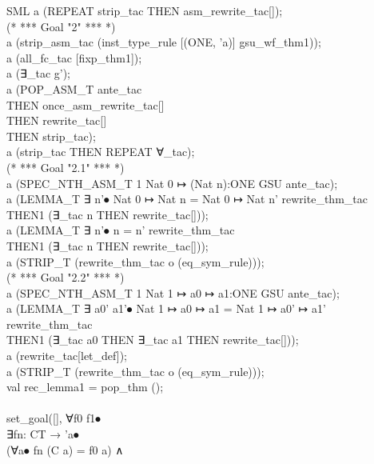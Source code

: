 {\begin{GFT}{SML}
\+a (REPEAT strip\_tac THEN asm\_rewrite\_tac[]);\\
\+(* *** Goal "2" *** *)\\
\+a (strip\_asm\_tac (inst\_type\_rule [(\PrJE{}ONE\PrKO{}, \PrJE{}'a\PrKO{})] gsu\_wf\_thm1));\\
\+a (all\_fc\_tac [fixp\_thm1]);\\
\+a (∃\_tac \PrKM{}g'\PrKO{});\\
\+a (POP\_ASM\_T ante\_tac\\
\+	THEN once\_asm\_rewrite\_tac[]\\
\+	THEN rewrite\_tac[]\\
\+	THEN strip\_tac);\\
\+a (strip\_tac THEN REPEAT ∀\_tac);\\
\+(* *** Goal "2.1" *** *)\\
\+a (SPEC\_NTH\_ASM\_T 1 \PrKM{}Nat 0 ↦ (Nat n):ONE GSU\PrKO{} ante\_tac);\\
\+a (LEMMA\_T \PrKM{}∃ n'⦁ Nat 0 ↦ Nat n = Nat 0 ↦ Nat n'\PrKO{} rewrite\_thm\_tac\\
\+	THEN1 (∃\_tac \PrKM{}n\PrKO{} THEN rewrite\_tac[]));\\
\+a (LEMMA\_T \PrKM{}∃ n'⦁ n = n'\PrKO{} rewrite\_thm\_tac\\
\+	THEN1 (∃\_tac \PrKM{}n\PrKO{} THEN rewrite\_tac[]));\\
\+a (STRIP\_T (rewrite\_thm\_tac o (eq\_sym\_rule)));\\
\+(* *** Goal "2.2" *** *)\\
\+a (SPEC\_NTH\_ASM\_T 1 \PrKM{}Nat 1 ↦ a0 ↦ a1:ONE GSU\PrKO{} ante\_tac);\\
\+a (LEMMA\_T \PrKM{}∃ a0' a1'⦁ Nat 1 ↦ a0 ↦ a1 = Nat 1 ↦ a0' ↦ a1'\PrKO{} rewrite\_thm\_tac\\
\+	THEN1 (∃\_tac \PrKM{}a0\PrKO{} THEN ∃\_tac \PrKM{}a1\PrKO{} THEN rewrite\_tac[]));\\
\+a (rewrite\_tac[let\_def]);\\
\+a (STRIP\_T (rewrite\_thm\_tac o (eq\_sym\_rule)));\\
\+val rec\_lemma1 = pop\_thm ();\\
\+\\
\+set\_goal([], \PrKM{}∀f0 f1⦁\\
\+         ∃fn: CT → 'a⦁\\
\+           (∀a⦁ fn (C a) = f0 a) ∧\\

\end{GFT}}
